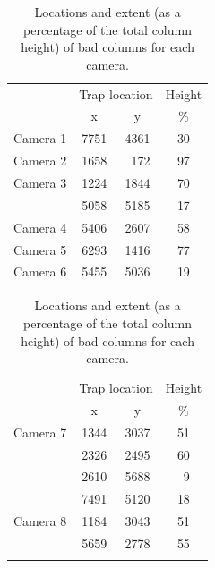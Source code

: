 \begin{colsection}
\begin{table}[t]
    \begin{center}
        \begin{tabular}{c|ccc} %
             & \multicolumn{2}{c}{Trap location} & Height \\
             & x & y & \% \\
            \midrule
            Camera 1 & 7751 & 4361 & 30 \\
            Camera 2 & 1658 & ~172 & 97 \\ %
            Camera 3 & 1224 & 1844 & 70 \\
                     & 5058 & 5185 & 17 \\
            Camera 4 & 5406 & 2607 & 58 \\
            Camera 5 & 6293 & 1416 & 77 \\
            Camera 6 & 5455 & 5036 & 19 \\
        \end{tabular}
        \hspace{0.5cm}
        \begin{tabular}{c|ccc} %
            & \multicolumn{2}{c}{Trap location} & Height \\
            & x & y & \% \\
            \midrule
            Camera 7 & 1344 & 3037 & 51 \\
                     & 2326 & 2495 & 60 \\
                     & 2610 & 5688 & ~9 \\ %
                     & 7491 & 5120 & 18 \\
            Camera 8 & 1184 & 3043 & 51 \\
                     & 5659 & 2778 & 55 \\
            \multicolumn{4}{c}{} \\
        \end{tabular}
    \end{center}
    \caption[Locations of bad columns]{
        Locations and extent (as a percentage of the total column height) of bad columns for each camera.
    }\label{tab:traps}
\end{table}


\end{colsection}
